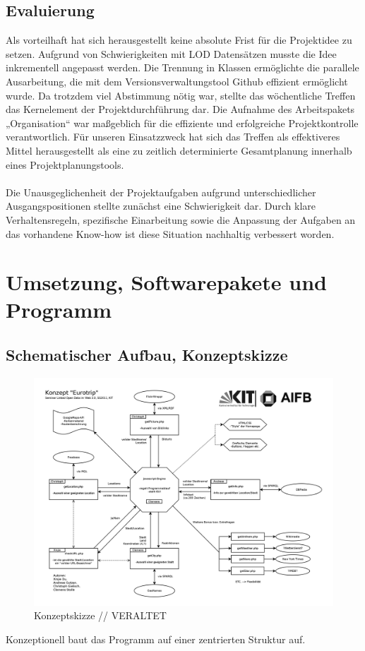 \documentclass[a4paper, 11pt]{article}
\begin{document}
\subsection{Evaluierung}
Als vorteilhaft hat sich herausgestellt keine absolute Frist für die Projektidee zu setzen. Aufgrund von Schwierigkeiten mit LOD Datensätzen musste die Idee inkrementell angepasst werden. Die Trennung in Klassen ermöglichte die parallele Ausarbeitung, die mit dem Versionsverwaltungstool Github  effizient ermöglicht wurde. Da trotzdem viel Abstimmung nötig war, stellte das wöchentliche Treffen das Kernelement der Projektdurchführung dar.  Die Aufnahme des Arbeitspakets „Organisation“ war maßgeblich für die effiziente und erfolgreiche Projektkontrolle verantwortlich. Für unseren Einsatzzweck hat sich das Treffen als effektiveres Mittel herausgestellt als eine zu zeitlich determinierte Gesamtplanung innerhalb eines Projektplanungstools.\\\\
Die Unausgeglichenheit der Projektaufgaben aufgrund unterschiedlicher Ausgangspositionen stellte zunächst eine Schwierigkeit dar. Durch klare Verhaltensregeln, spezifische Einarbeitung sowie die Anpassung der Aufgaben an das vorhandene Know-how ist diese Situation nachhaltig verbessert worden.
\newpage
\section{Umsetzung, Softwarepakete und Programm}
\subsection{Schematischer Aufbau, Konzeptskizze}
\begin{figure}[H]
	\centering
	\includegraphics[width=0.5\columnwidth, angle=0]{seminarLOD.png}
	\caption{Konzeptskizze // VERALTET}
	\label{img:grafik-dummy}
\end{figure}
Konzeptionell baut das Programm auf einer zentrierten Struktur auf.
\end{document}
